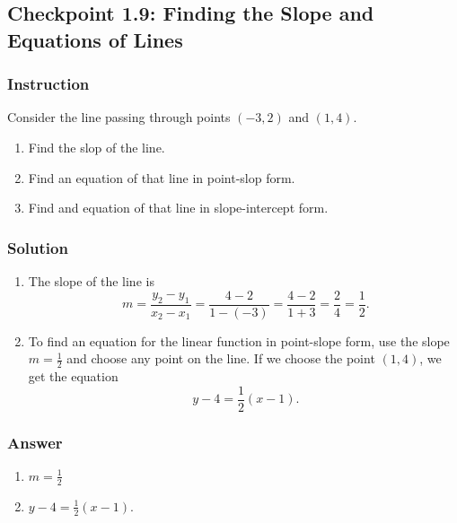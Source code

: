 \subsection*{Checkpoint 1.9: Finding the Slope and Equations of Lines}

\subsubsection*{Instruction}

Consider the line passing through points  $ (-3,2) $ and  $ (1,4) $.

\begin{enumerate}[label = (\alph*)]
  \item
    Find the slop of the line.
  \item
    Find an equation of that line in point-slop form.
  \item
    Find and equation of that line in slope-intercept form.
\end{enumerate}

\subsubsection*{Solution}

\begin{enumerate}[label = (\alph*)]
  \item
    The slope of the line is
    $$ \phantom{.}
    m = \frac{y_2 - y_1}{x_2 - x_1} = \frac{4 - 2}{1 - (-3)} = \frac{4 - 2}{1 + 3} = \frac{2}{4} = \frac{1}{2}
    .$$
  \item To find an equation for the linear function in point-slope form, use the slope $ m = \frac{1}{2} $ and choose any point on the line. If we choose the point $ (1, 4) $, we get the equation
    $$ \phantom{.}
    y - 4 = \frac{1}{2}(x - 1)
    .$$
\end{enumerate}

\subsubsection{Answer}

\begin{enumerate}[label = (\alph*)]
  \item
    $ m = \frac{1}{2} $
  \item
    $ y - 4 = \frac{1}{2}(x - 1) $.
\end{enumerate}
